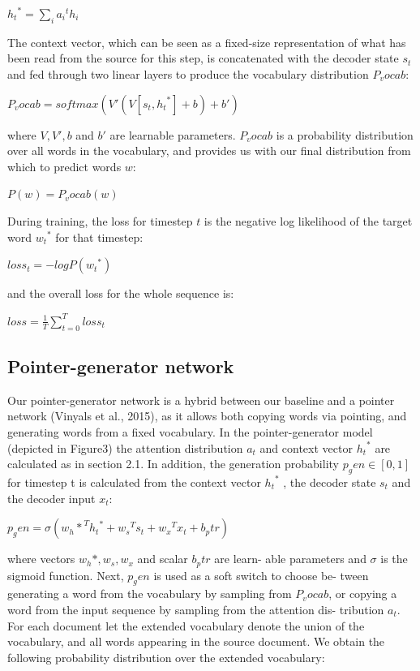\documentclass[UTF8]{ctexart}
\begin{document}
$    {h_t}^*=\sum_{i}{a_i}^t h_i$

The context vector, which can be seen as a fixed-size representation of what has been read from the
source for this step, is concatenated with the decoder state $s_t$ and fed through two linear layers to
produce the vocabulary distribution $P_vocab$:

$   P_vocab =softmax(V'(V[s_t,{h_t}^*]+b)+b')  $

where $V , V', b$ and $b'$ are learnable parameters.
$P_vocab$ is a probability distribution over all words
in the vocabulary, and provides us with our final
distribution from which to predict words $w$:


$ P(w)=P_vocab(w)  $

During training, the loss for timestep $t$ is the negative log likelihood of the target word ${w_t}^*$ for that
timestep:

$ loss_t=-logP({w_t}^*) $

and the overall loss for the whole sequence is:

$ loss=\frac{1}{T}\sum_{t=0}^{T}loss_t  $

   \subsection{Pointer-generator network}

   Our pointer-generator network is a hybrid between
our baseline and a pointer network (Vinyals et al.,
2015), as it allows both copying words via pointing, and generating words from a fixed vocabulary.
In the pointer-generator model (depicted in Figure3) the attention distribution $a_t$ and context vector
${h_t}^*$ are calculated as in section 2.1. In addition, the
generation probability $p_gen \in [0,1]$ for timestep t is
calculated from the context vector ${h_t}^*$ , the decoder
state $s_t$ and the decoder input $x_t$:

$ p_gen = \sigma ({w_h*}^T {h_t}^* +  {w_s}^T s_t  +  {w_x}^T x_t +b_ptr) $


where vectors $w_h*, w_s, w_x$ and scalar $b_ptr$ are learn-
able parameters and $\sigma$ is the sigmoid function.
Next, $p_gen$ is used as a soft switch to choose be-
tween generating a word from the vocabulary by
sampling from $P_vocab$, or copying a word from the
input sequence by sampling from the attention dis-
tribution $a_t$. For each document let the extended
vocabulary denote the union of the vocabulary,
and all words appearing in the source document.
We obtain the following probability distribution
over the extended vocabulary:
\end{document}
